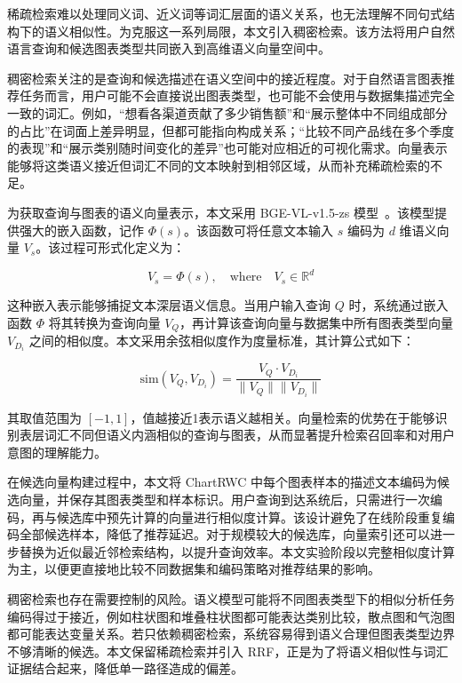 稀疏检索难以处理同义词、近义词等词汇层面的语义关系，也无法理解不同句式结构下的语义相似性。为克服这一系列局限，本文引入稠密检索。该方法将用户自然语言查询和候选图表类型共同嵌入到高维语义向量空间中。

稠密检索关注的是查询和候选描述在语义空间中的接近程度。对于自然语言图表推荐任务而言，用户可能不会直接说出图表类型，也可能不会使用与数据集描述完全一致的词汇。例如，“想看各渠道贡献了多少销售额”和“展示整体中不同组成部分的占比”在词面上差异明显，但都可能指向构成关系；“比较不同产品线在多个季度的表现”和“展示类别随时间变化的差异”也可能对应相近的可视化需求。向量表示能够将这类语义接近但词汇不同的文本映射到相邻区域，从而补充稀疏检索的不足。

为获取查询与图表的语义向量表示，本文采用 BGE-VL-v1.5-zs 模型~\cite{zhou2024megapairs}。该模型提供强大的嵌入函数，记作 $\Phi(s)$。该函数可将任意文本输入 $s$ 编码为 $d$ 维语义向量 $V_s$。该过程可形式化定义为：

\begin{equation}
V_s = \Phi(s), \quad \text{where} \quad V_s \in \mathbb{R}^d
\end{equation}

这种嵌入表示能够捕捉文本深层语义信息。当用户输入查询 $Q$ 时，系统通过嵌入函数 $\Phi$ 将其转换为查询向量 $V_Q$，再计算该查询向量与数据集中所有图表类型向量 $V_{D_i}$ 之间的相似度。本文采用余弦相似度作为度量标准，其计算公式如下：

\begin{equation}
    \text{sim}(V_Q, V_{D_i}) = \frac{V_Q \cdot V_{D_i}}{\|V_Q\| \|V_{D_i}\|}
\end{equation}

其取值范围为 $[-1,1]$，值越接近1表示语义越相关。向量检索的优势在于能够识别表层词汇不同但语义内涵相似的查询与图表，从而显著提升检索召回率和对用户意图的理解能力。

在候选向量构建过程中，本文将 ChartRWC 中每个图表样本的描述文本编码为候选向量，并保存其图表类型和样本标识。用户查询到达系统后，只需进行一次编码，再与候选库中预先计算的向量进行相似度计算。该设计避免了在线阶段重复编码全部候选样本，降低了推荐延迟。对于规模较大的候选库，向量索引还可以进一步替换为近似最近邻检索结构，以提升查询效率。本文实验阶段以完整相似度计算为主，以便更直接地比较不同数据集和编码策略对推荐结果的影响。

稠密检索也存在需要控制的风险。语义模型可能将不同图表类型下的相似分析任务编码得过于接近，例如柱状图和堆叠柱状图都可能表达类别比较，散点图和气泡图都可能表达变量关系。若只依赖稠密检索，系统容易得到语义合理但图表类型边界不够清晰的候选。本文保留稀疏检索并引入 RRF，正是为了将语义相似性与词汇证据结合起来，降低单一路径造成的偏差。


